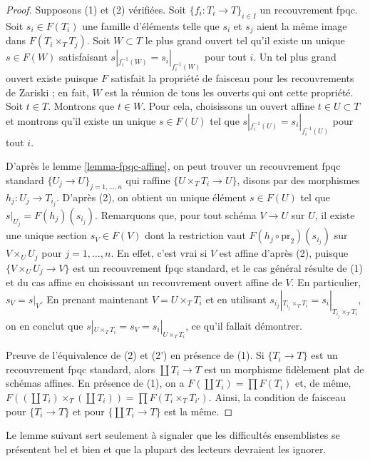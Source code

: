 \begin{proof}
Supposons (1) et (2) vérifiées.
Soit $\{f_i : T_i \to T\}_{i \in I}$ un recouvrement fpqc. Soit $s_i \in F(T_i)$
une famille d'éléments telle que $s_i$ et $s_j$ aient la même image
dans $F(T_i \times_T T_j)$. Soit $W \subset T$ le plus grand ouvert
tel qu'il existe un unique $s \in F(W)$ satisfaisant
$s|_{f_i^{-1}(W)} = s_i|_{f_i^{-1}(W)}$ pour tout $i$.
Un tel plus grand ouvert existe puisque $F$ satisfait la
propriété de faisceau pour les recouvrements de Zariski ; en fait, $W$ est la
réunion de tous les ouverts qui ont cette propriété. Soit $t \in T$.
Montrons que $t \in W$. Pour cela, choisissons un ouvert affine
$t \in U \subset T$ et montrons qu'il existe un unique
$s \in F(U)$ tel que
$s|_{f_i^{-1}(U)} = s_i|_{f_i^{-1}(U)}$ pour tout $i$.

\medskip\noindent
D'après le lemme \ref{lemma-fpqc-affine}, on peut trouver un recouvrement fpqc standard
$\{U_j \to U\}_{j = 1, \ldots, n}$ qui raffine $\{U \times_T T_i \to U\}$,
disons par des morphismes $h_j : U_j \to T_{i_j}$. D'après (2), on obtient un unique élément
$s \in F(U)$ tel que $s|_{U_j} = F(h_j)(s_{i_j})$. Remarquons que, pour tout
schéma $V \to U$ sur $U$, il existe une unique section $s_V \in F(V)$
dont la restriction vaut $F(h_j \circ \text{pr}_2)(s_{i_j})$ sur
$V \times_U U_j$ pour $j = 1, \ldots, n$. En effet, c'est vrai si $V$
est affine d'après (2), puisque $\{V \times_U U_j \to V\}$ est un recouvrement fpqc standard,
et le cas général résulte de (1) et du cas affine en choisissant un
recouvrement ouvert affine de $V$. En particulier, $s_V = s|_V$.
En prenant maintenant $V = U \times_T T_i$ et en utilisant
$s_{i_j}|_{T_{i_j} \times_T T_i} = s_i|_{T_{i_j} \times_T T_i}$,
on en conclut que $s|_{U \times_T T_i} = s_V = s_i|_{U \times_T T_i}$,
ce qu'il fallait démontrer.

\medskip\noindent
Preuve de l'équivalence de (2) et (2') en présence de (1).
Si $\{T_i \to T\}$ est un recouvrement fpqc standard, alors
$\coprod T_i \to T$ est un morphisme fidèlement plat de schémas affines.
En présence de (1), on a $F(\coprod T_i) = \prod F(T_i)$
et, de même,
$F((\coprod T_i) \times_T (\coprod T_i)) = \prod F(T_i \times_T T_{i'})$.
Ainsi, la condition de faisceau pour $\{T_i \to T\}$ et pour $\{\coprod T_i \to T\}$
est la même.
\end{proof}

\noindent
Le lemme suivant sert seulement à signaler que les difficultés ensemblistes
se présentent bel et bien et que la plupart des lecteurs devraient les ignorer.

